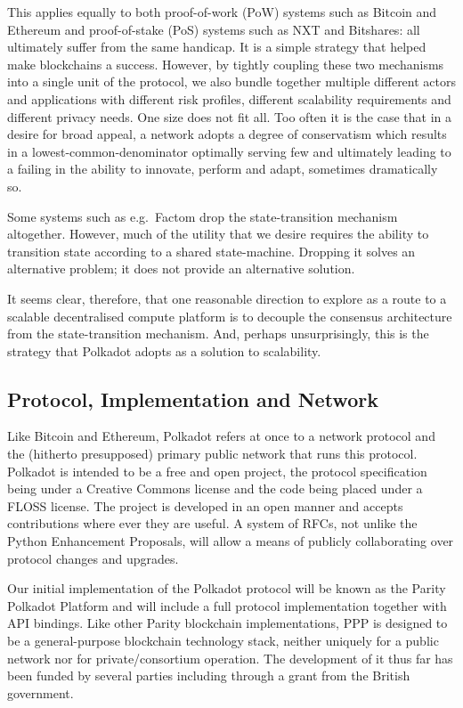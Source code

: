 \documentclass[9pt,oneside]{amsart}
\makeatletter
\newcommand*\eg{e.g.\@\xspace}
\makeatother
\begin{document}
\begin{multicols}{2}
This applies equally to both proof-of-work (PoW) systems such as Bitcoin\cite{nakamoto2008bitcoin} and Ethereum\cite{buterin2013whitepaper,wood2014yellow} and proof-of-stake (PoS) systems such as NXT\cite{nxt} and Bitshares\cite{bitshares}: all ultimately suffer from the same handicap. It is a simple strategy that helped make blockchains a success. However, by tightly coupling these two mechanisms into a single unit of the protocol, we also bundle together multiple different actors and applications with different risk profiles, different scalability requirements and different privacy needs. One size does not fit all. Too often it is the case that in a desire for broad appeal, a network adopts a degree of conservatism which results in a lowest-common-denominator optimally serving few and ultimately leading to a failing in the ability to innovate, perform and adapt, sometimes dramatically so.

Some systems such as \eg~Factom\cite{snow2014factom} drop the state-transition mechanism altogether. However, much of the utility that we desire requires the ability to transition state according to a shared state-machine. Dropping it solves an alternative problem; it does not provide an alternative solution.

 It seems clear, therefore, that one reasonable direction to explore as a route to a scalable decentralised compute platform is to decouple the consensus architecture from the state-transition mechanism. And, perhaps unsurprisingly, this is the strategy that Polkadot adopts as a solution to scalability.

\subsection{Protocol, Implementation and Network}\label{stack-versus-network}

 Like Bitcoin and Ethereum, Polkadot refers at once to a network protocol and the (hitherto presupposed) primary public network that runs this protocol. Polkadot is intended to be a free and open project, the protocol specification being under a Creative Commons license and the code being placed under a FLOSS license. The project is developed in an open manner and accepts contributions where ever they are useful. A system of RFCs, not unlike the Python Enhancement Proposals, will allow a means of publicly collaborating over protocol changes and upgrades.

 Our initial implementation of the Polkadot protocol will be known as the Parity Polkadot Platform and will include a full protocol implementation together with API bindings. Like other Parity blockchain implementations, PPP is designed to be a general-purpose blockchain technology stack, neither uniquely for a public network nor for private/consortium operation. The development of it thus far has been funded by several parties including through a grant from the British government.


\end{multicols}
\end{document}
